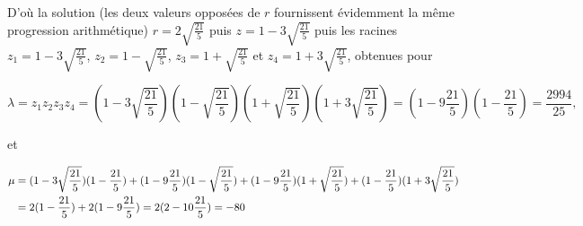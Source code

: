 {{D'où la solution (les deux valeurs opposées de $r$ fournissent évidemment la même progression arithmétique)
$r=2\sqrt{\frac{21}{5}}$ puis $z=1-3\sqrt{\frac{21}{5}}$ puis les racines $z_1=1-3\sqrt{\frac{21}{5}}$, $z_2=1-\sqrt{\frac{21}{5}}$, $z_3=1+\sqrt{\frac{21}{5}}$ et $z_4=1+3\sqrt{\frac{21}{5}}$, obtenues pour 

$$\lambda=z_1z_2z_3z_4=(1-3\sqrt{\frac{21}{5}})(1-\sqrt{\frac{21}{5}})(1+\sqrt{\frac{21}{5}})
(1+3\sqrt{\frac{21}{5}})= (1-9\frac{21}{5})(1-\frac{21}{5})=\frac{2994}{25},$$
 
et 

\begin{align*}\ensuremath
\mu&=(1-3\sqrt{\frac{21}{5}})(1-\frac{21}{5})+(1-9\frac{21}{5})(1-\sqrt{\frac{21}{5}})+(1-9\frac{21}{5})(1+\sqrt{\frac{21}{5}})+(1-\frac{21}{5})(1+3\sqrt{\frac{21}{5}})\\
 &=2(1-\frac{21}{5})+2(1-9\frac{21}{5})=2(2-10\frac{21}{5})=-80
\end{align*}
}
}
